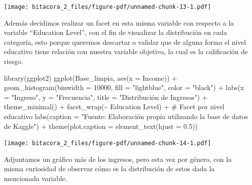 \documentclass[
  letterpaper,
  DIV=11,
  numbers=noendperiod]{scrreprt}
\newenvironment{Shaded}{\begin{snugshade}}{\end{snugshade}}
\newcommand{\AttributeTok}[1]{\textcolor[rgb]{0.40,0.45,0.13}{#1}}
\newcommand{\CommentTok}[1]{\textcolor[rgb]{0.37,0.37,0.37}{#1}}
\newcommand{\DecValTok}[1]{\textcolor[rgb]{0.68,0.00,0.00}{#1}}
\newcommand{\FloatTok}[1]{\textcolor[rgb]{0.68,0.00,0.00}{#1}}
\newcommand{\FunctionTok}[1]{\textcolor[rgb]{0.28,0.35,0.67}{#1}}
\newcommand{\NormalTok}[1]{\textcolor[rgb]{0.00,0.23,0.31}{#1}}
\newcommand{\SpecialCharTok}[1]{\textcolor[rgb]{0.37,0.37,0.37}{#1}}
\newcommand{\StringTok}[1]{\textcolor[rgb]{0.13,0.47,0.30}{#1}}
\begin{document}
\texttt{[image: bitacora\_2\_files/figure-pdf/unnamed-chunk-13-1.pdf]}

Además decidimos realizar un facet en esta misma variable con respecto a
la variable ``Education Level'', con el fin de visualizar la
distribución en cada categoría, esto porque queremos descartar o validar
que de alguna forma el nivel educativo tiene relación con nuestra
variable objetivo, la cual es la calificación de riesgo.

\begin{Shaded}
\begin{Highlighting}[]
\FunctionTok{library}\NormalTok{(ggplot2)}
\FunctionTok{ggplot}\NormalTok{(Base\_limpia, }\FunctionTok{aes}\NormalTok{(}\AttributeTok{x =}\NormalTok{ Income)) }\SpecialCharTok{+} 
  \FunctionTok{geom\_histogram}\NormalTok{(}\AttributeTok{binwidth =} \DecValTok{10000}\NormalTok{, }\AttributeTok{fill =} \StringTok{"lightblue"}\NormalTok{, }\AttributeTok{color =} \StringTok{"black"}\NormalTok{) }\SpecialCharTok{+} 
  \FunctionTok{labs}\NormalTok{(}\AttributeTok{x =} \StringTok{"Ingreso"}\NormalTok{, }\AttributeTok{y =} \StringTok{"Frecuencia"}\NormalTok{, }\AttributeTok{title =} \StringTok{"Distribución de Ingresos"}\NormalTok{) }\SpecialCharTok{+} \FunctionTok{theme\_minimal}\NormalTok{() }\SpecialCharTok{+}
  \FunctionTok{facet\_wrap}\NormalTok{(}\SpecialCharTok{\textasciitilde{}} \StringTok{\textasciigrave{}}\AttributeTok{Education Level}\StringTok{\textasciigrave{}}\NormalTok{) }\SpecialCharTok{+} \CommentTok{\# Facet por nivel educativo}
  \FunctionTok{labs}\NormalTok{(}\AttributeTok{caption =} \StringTok{"Fuente: Elaboración propia utilizando la base de datos de Kaggle"}\NormalTok{) }\SpecialCharTok{+}
\FunctionTok{theme}\NormalTok{(}\AttributeTok{plot.caption =} \FunctionTok{element\_text}\NormalTok{(}\AttributeTok{hjust =} \FloatTok{0.5}\NormalTok{)) }
\end{Highlighting}
\end{Shaded}

\texttt{[image: bitacora\_2\_files/figure-pdf/unnamed-chunk-14-1.pdf]}

Adjuntamos un gráfico más de los ingresos, pero esta vez por género, con
la misma curiosidad de observar cómo es la distribución de estos dada la
mencionada variable.
\end{document}

